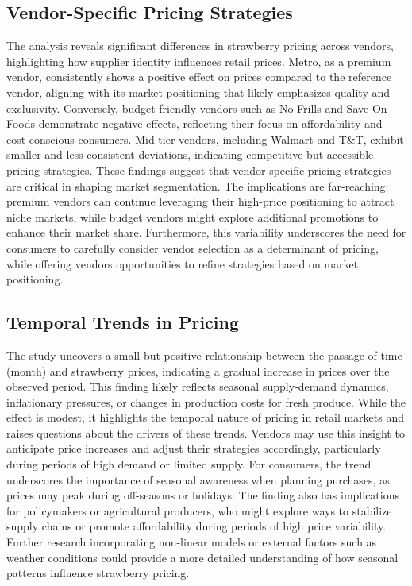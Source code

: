 \documentclass[
  letterpaper,
  DIV=11,
  numbers=noendperiod]{scrartcl}
\begin{document}
\subsection{Vendor-Specific Pricing
Strategies}\label{vendor-specific-pricing-strategies}

The analysis reveals significant differences in strawberry pricing
across vendors, highlighting how supplier identity influences retail
prices. Metro, as a premium vendor, consistently shows a positive effect
on prices compared to the reference vendor, aligning with its market
positioning that likely emphasizes quality and exclusivity. Conversely,
budget-friendly vendors such as No Frills and Save-On-Foods demonstrate
negative effects, reflecting their focus on affordability and
cost-conscious consumers. Mid-tier vendors, including Walmart and T\&T,
exhibit smaller and less consistent deviations, indicating competitive
but accessible pricing strategies. These findings suggest that
vendor-specific pricing strategies are critical in shaping market
segmentation. The implications are far-reaching: premium vendors can
continue leveraging their high-price positioning to attract niche
markets, while budget vendors might explore additional promotions to
enhance their market share. Furthermore, this variability underscores
the need for consumers to carefully consider vendor selection as a
determinant of pricing, while offering vendors opportunities to refine
strategies based on market positioning.

\subsection{Temporal Trends in
Pricing}\label{temporal-trends-in-pricing}

The study uncovers a small but positive relationship between the passage
of time (month) and strawberry prices, indicating a gradual increase in
prices over the observed period. This finding likely reflects seasonal
supply-demand dynamics, inflationary pressures, or changes in production
costs for fresh produce. While the effect is modest, it highlights the
temporal nature of pricing in retail markets and raises questions about
the drivers of these trends. Vendors may use this insight to anticipate
price increases and adjust their strategies accordingly, particularly
during periods of high demand or limited supply. For consumers, the
trend underscores the importance of seasonal awareness when planning
purchases, as prices may peak during off-seasons or holidays. The
finding also has implications for policymakers or agricultural
producers, who might explore ways to stabilize supply chains or promote
affordability during periods of high price variability. Further research
incorporating non-linear models or external factors such as weather
conditions could provide a more detailed understanding of how seasonal
patterns influence strawberry pricing.
\end{document}
